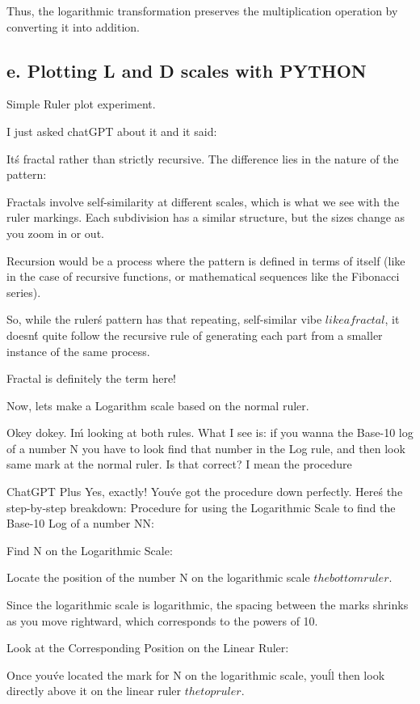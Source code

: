 \documentclass[10pt,twocolumn]{article}
\begin{document}
Thus, the logarithmic transformation preserves the multiplication operation by converting it into addition.


\subsection*{e. Plotting L and D scales with PYTHON}

Simple Ruler plot experiment.

I just asked chatGPT about it and it said:

It\'s fractal rather than strictly recursive. The difference lies in the nature of the pattern:

Fractals involve self-similarity at different scales, which is what we see with the ruler markings. Each subdivision has a similar structure, but the sizes change as you zoom in or out.

Recursion would be a process where the pattern is defined in terms of itself (like in the case of recursive functions, or mathematical sequences like the Fibonacci series).

So, while the ruler\'s pattern has that repeating, self-similar vibe \(like a fractal\), it doesn\'t quite follow the recursive rule of generating each part from a smaller instance of the same process.

Fractal is definitely the term here!

Now, lets make a Logarithm scale based on the normal ruler.

Okey dokey. I\'m looking at both rules. What I see is: if you wanna the Base-10 log of a number N you have to look find that number in the Log rule, and then look same mark at the normal ruler. Is that correct? I mean the procedure

ChatGPT Plus
Yes, exactly! You\'ve got the procedure down perfectly. Here\'s the step-by-step breakdown:
Procedure for using the Logarithmic Scale to find the Base-10 Log of a number NN:

Find N on the Logarithmic Scale:

Locate the position of the number N on the logarithmic scale \(the bottom ruler\).

Since the logarithmic scale is logarithmic, the spacing between the marks shrinks as you move rightward, which corresponds to the powers of 10.

Look at the Corresponding Position on the Linear Ruler:

Once you\'ve located the mark for N on the logarithmic scale, you\'ll then look directly above it on the linear ruler \( the top ruler \).
\end{document}
